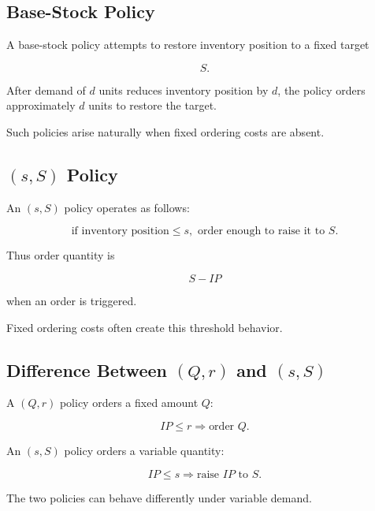 \subsection{Base-Stock Policy}
\label{subsec:base-stock-policy}

A base-stock policy attempts to restore inventory position to a fixed
target

\[
\boxed{
S.
}
\]

After demand of \(d\) units reduces inventory position by \(d\), the policy
orders approximately \(d\) units to restore the target.

Such policies arise naturally when fixed ordering costs are absent.

\subsection{\((s,S)\) Policy}
\label{subsec:s-S-policy}

An \((s,S)\) policy operates as follows:

\[
\boxed{
\text{if inventory position}\leq s,
\text{ order enough to raise it to }S.
}
\]

Thus order quantity is

\[
\boxed{
S-IP
}
\]

when an order is triggered.

Fixed ordering costs often create this threshold behavior.

\subsection{Difference Between \((Q,r)\) and \((s,S)\)}
\label{subsec:q-r-versus-s-S}

A \((Q,r)\) policy orders a fixed amount \(Q\):

\[
\boxed{
IP\leq r
\Rightarrow
\text{order }Q.
}
\]

An \((s,S)\) policy orders a variable quantity:

\[
\boxed{
IP\leq s
\Rightarrow
\text{raise }IP\text{ to }S.
}
\]

The two policies can behave differently under variable demand.

